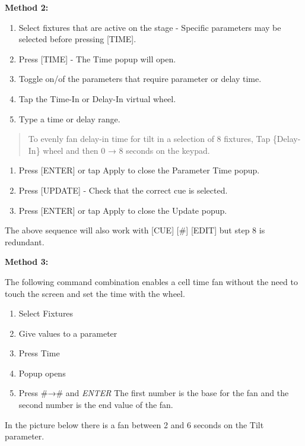 \documentclass[
]{article}
\begin{document}
\textbf{Method 2:}

\begin{enumerate}
\def\labelenumi{\arabic{enumi}.}
\item
  Select fixtures that are active on the stage - Specific parameters may be selected before pressing {[}TIME{]}.
\item
  Press {[}TIME{]} - The Time popup will open.
\item
  Toggle on/of the parameters that require parameter or delay time.
\item
  Tap the Time-In or Delay-In virtual wheel.
\item
  Type a time or delay range.
\end{enumerate}

\begin{quote}
To evenly fan delay-in time for tilt in a selection of 8 fixtures, Tap \{Delay-In\} wheel and then 0 → 8 seconds on the keypad.
\end{quote}

\begin{enumerate}
\def\labelenumi{\arabic{enumi}.}
\setcounter{enumi}{5}
\item
  Press {[}ENTER{]} or tap Apply to close the Parameter Time popup.
\item
  Press {[}UPDATE{]} - Check that the correct cue is selected.
\item
  Press {[}ENTER{]} or tap Apply to close the Update popup.
\end{enumerate}

The above sequence will also work with {[}CUE{]} {[}\#{]} {[}EDIT{]} but step 8 is redundant.

\textbf{Method 3:}

The following command combination enables a cell time fan without the need to touch the screen and set the time with the wheel.

\begin{enumerate}
\def\labelenumi{\arabic{enumi}.}
\item
  Select Fixtures
\item
  Give values to a parameter
\item
  Press Time
\item
  Popup opens
\item
  Press \#→\# and \emph{ENTER} The first number is the base for the fan and the second number is the end value of the fan.
\end{enumerate}

In the picture below there is a fan between 2 and 6 seconds on the Tilt parameter.
\end{document}
